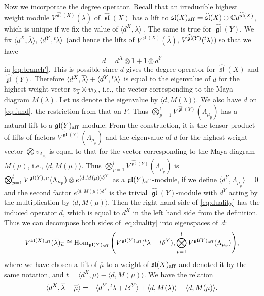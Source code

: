 \documentclass[pdftex]{sigma}
\theoremstyle{definition}
\numberwithin{equation}{section}
\newcommand{\lsp}[2]{{\mskip-.3mu}{}^{#1}\mskip-1mu{#2}}
\newcommand{\C}{{\mathbb C}}
\newcommand{\algsl}{\operatorname{\mathfrak{sl}}} %
\newcommand{\gl}{\operatorname{\mathfrak{gl}}}
\newcommand{\Hom}{\operatorname{Hom}}
\newcommand{\aff}{\mathrm{af\/f}}
\begin{document}
Now we incorporate the degree operator. Recall that an irreducible
highest weight module $V^{\widehat{\algsl}(X)}(\overline\lambda)$ of
$\widehat{\algsl}(X)$ has a lift to $\algsl(X)_\aff =
\widehat{\algsl}(X)\oplus\C d^{\widehat{\algsl}(X)}$, which is unique
if we f\/ix the value of $\langle
d^X,\overline\lambda\rangle$ \cite[\S~9.10]{Kac}.
%
The same is true for $\widehat{\gl}(Y)$.
%
We f\/ix $\langle d^X,\overline\lambda\rangle$, $\langle
d^Y,\lsp{t}\lambda\rangle$ (and hence the lifts of
$V^{\widehat{\algsl}(X)}(\overline\lambda)$,
$V^{\widehat{\gl}(Y)}(\lsp{t}\lambda)$) so that we have
\begin{equation*}
   d = d^X\otimes 1
   + 1\otimes d^Y
\end{equation*}
in \eqref{eq:branch'}. This is possible since $d$ gives the degree
operator for $\widehat{\algsl}(X)$ and $\widehat{\gl}(Y)$.
%
Therefore
\(
   \langle d^X,\overline\lambda\rangle
   + \langle d^Y,\lsp{t}\lambda\rangle
\)
is equal to the eigenvalue of $d$ for
the highest weight vector $v_{\overline{\lambda}}\otimes
v_{\lsp{t}\lambda}$, i.e., the vector corresponding to the Maya
diagram $M(\lambda)$. Let us denote the eigenvalue by $\langle d,
M(\lambda)\rangle$.
%
We also have $d$ on \eqref{eq:fund}, the restriction from that on $F$.
Thus $\bigotimes_{p=1}^l V^{\widehat{\gl}(Y)}(\Lambda_{\mu_p})$ has a
natural lift to a $\gl(Y)_\aff$-module.
%
From the construction, it is the tensor product of lifts of factors
$V^{\widehat{\gl}(Y)}(\Lambda_{\mu_p})$ and the eigenvalue of $d$ for
the highest weight vector $\bigotimes v_{\Lambda_{\mu_p}}$ is equal to
that for the vector corresponding to the Maya diagram $M(\mu)$, i.e.,
$\langle d, M(\mu)\rangle$. Thus $\bigotimes_{p=1}^l
V^{\widehat{\gl}(Y)}(\Lambda_{\mu_p})$ is $\bigotimes_{p=1}^l
V^{{\gl}(Y)_\aff}(\Lambda_{\mu_p})\otimes e^{\langle d,
  M(\mu)\rangle\delta^Y}$ as a $\gl(Y)_\aff$-module, if we def\/ine
$\langle d^Y, \Lambda_{\mu_p}\rangle = 0$ and the second factor
$e^{\langle d, M(\mu)\rangle\delta^Y}$ is the trivial
$\widehat{\gl}(Y)$-module with $d^Y$ acting by the multiplication by
$\langle d, M(\mu)\rangle$.
%
Then the right hand side of \eqref{eq:duality} has the induced
operator $d$, which is equal to $d^X$ in the left
hand side from the def\/inition.
%
Thus we can decompose both sides of \eqref{eq:duality} into
eigenspaces of~$d$:
\begin{gather}\label{eq:duality'}
  V^{{\algsl}(X)_\aff}(\overline\lambda)_{\overline\mu}
  \cong
  \Hom_{{\gl}(Y)_\aff}\Bigg(V^{{\gl}(Y)_\aff}(\lsp{t}\lambda
  + t \delta^Y),
  \bigotimes_{p=1}^l V^{{\gl}(Y)_\aff}(\Lambda_{\mu_p})\Bigg),
\end{gather}
where we have chosen a lift of $\overline\mu$ to a weight of
$\algsl(X)_\aff$ and denoted it by the same notation, and
$t = \langle d^X, \overline\mu\rangle- \langle d, M(\mu)\rangle$.
We have the relation
\begin{equation}\label{eq:weights_rel}
  \langle d^X,\overline{\lambda} - \overline{\mu}\rangle
  = - \langle d^Y, \lsp{t}\lambda + t\delta^Y \rangle
  + \langle d,M(\lambda)\rangle  - \langle d,M(\mu)\rangle.
\end{equation}
\end{document}
